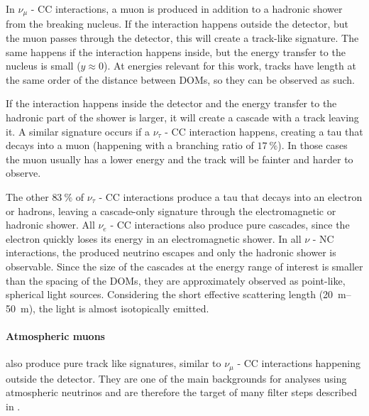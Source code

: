 In $\nu_\mu$ - CC interactions, a muon is produced in addition to a hadronic shower from the breaking nucleus. If the interaction happens outside the detector, but the muon passes through the detector, this will create a track-like signature. The same happens if the interaction happens inside, but the energy transfer to the nucleus is small ($y \approx 0$). At energies relevant for this work, tracks have length at the same order of the distance between DOMs, so they can be observed as such.

If the interaction happens inside the detector and the energy transfer to the hadronic part of the shower is larger, it will create a cascade with a track leaving it. A similar signature occurs if a $\nu_\tau$ - CC interaction happens, creating a tau that decays into a muon (happening with a branching ratio of $\SI{17}{\percent}$). In those cases the muon usually has a lower energy and the track will be fainter and harder to observe.

The other $\SI{83}{\percent}$ of $\nu_\tau$ - CC interactions produce a tau that decays into an electron or hadrons, leaving a cascade-only signature through the electromagnetic or hadronic shower. All $\nu_e$ - CC interactions also produce pure cascades, since the electron quickly loses its energy in an electromagnetic shower. In all $\nu$ - NC interactions, the produced neutrino escapes and only the hadronic shower is observable. Since the size of the cascades at the energy range of interest is smaller than the spacing of the DOMs, they are approximately observed as point-like, spherical light sources. Considering the short effective scattering length (\SIrange[range-phrase=-]{20}{50}{\meter}), the light is almost isotopically emitted.


\paragraph{Atmospheric muons} also produce pure track like signatures, similar to $\nu_\mu$ - CC interactions happening outside the detector. They are one of the main backgrounds for analyses using atmospheric neutrinos and are therefore the target of many filter steps described in .
